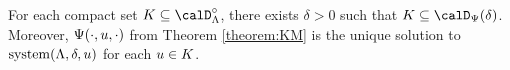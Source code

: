 \begin{proposition}
  \label{proposition:compact-ode-existence}
  For each compact set $K \subseteq \odeSpace^\circ$, there exists $\delta > 0$ such that $K \subseteq \momentSpace(\delta)$.
  Moreover, $\Psi(\cdot,u,\cdot)$ from Theorem \ref{theorem:KM} is the unique solution to $\operatorname{system}(\Lambda,\delta,u)$ for each $u \in K$.
\end{proposition}
